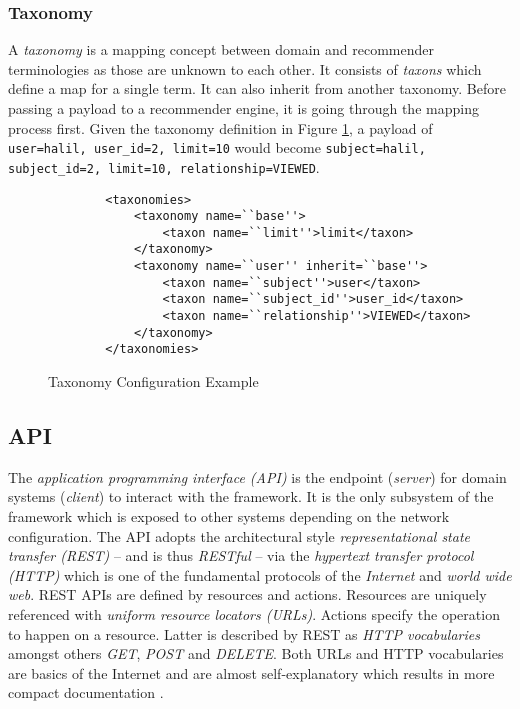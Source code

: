 \subsubsection{Taxonomy}

A \emph{taxonomy} is a mapping concept between domain and recommender terminologies as those are unknown to each other. It consists of \emph{taxons} which define a map for a single term. It can also inherit from another taxonomy. Before passing a payload to a recommender engine, it is going through the mapping process first. Given the taxonomy definition in Figure \ref{fig:architecture-framework-taxonomy}, a payload of \texttt{user=halil, user_id=2, limit=10} would become \texttt{subject=halil, subject_id=2, limit=10, relationship=VIEWED}.

\begin{figure}[ht]
    \begin{verbatim}
        <taxonomies>
            <taxonomy name=``base''>
                <taxon name=``limit''>limit</taxon>
            </taxonomy>
            <taxonomy name=``user'' inherit=``base''>
                <taxon name=``subject''>user</taxon>
                <taxon name=``subject_id''>user_id</taxon>
                <taxon name=``relationship''>VIEWED</taxon>
            </taxonomy>
        </taxonomies>
    \end{verbatim}
    \caption{Taxonomy Configuration Example}
    \label{fig:architecture-framework-taxonomy}
\end{figure}

\subsection{API}

The \emph{application programming interface (API)} is the endpoint (\emph{server}) for domain systems (\emph{client}) to interact with the framework. It is the only subsystem of the framework which is exposed to other systems depending on the network configuration. The API adopts the architectural style \emph{representational state transfer (REST)} -- and is thus \emph{RESTful} -- via the \emph{hypertext transfer protocol (HTTP)} which is one of the fundamental protocols of the \emph{Internet} and \emph{world wide web}. REST APIs are defined by resources and actions. Resources are uniquely referenced with \emph{uniform resource locators (URLs)}. Actions specify the operation to happen on a resource. Latter is described by REST as \emph{HTTP vocabularies} amongst others \emph{GET}, \emph{POST} and \emph{DELETE}. Both URLs and HTTP vocabularies are basics of the Internet and are almost self-explanatory which results in more compact documentation \cite{fielding00}.


